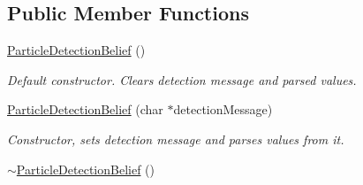 \subsection*{Public Member Functions}
\begin{DoxyCompactItemize}
\item 
\hypertarget{class_particle_detection_belief_a801d6337798aac5728eb16c76b06df9d}{
\hyperlink{class_particle_detection_belief_a801d6337798aac5728eb16c76b06df9d}{ParticleDetectionBelief} ()}
\label{class_particle_detection_belief_a801d6337798aac5728eb16c76b06df9d}

\begin{DoxyCompactList}\small\item\em Default constructor. Clears detection message and parsed values. \end{DoxyCompactList}\item 
\hypertarget{class_particle_detection_belief_a37a6e7bf59cf0476ea0e4b2d0f74425e}{
\hyperlink{class_particle_detection_belief_a37a6e7bf59cf0476ea0e4b2d0f74425e}{ParticleDetectionBelief} (char $\ast$detectionMessage)}
\label{class_particle_detection_belief_a37a6e7bf59cf0476ea0e4b2d0f74425e}

\begin{DoxyCompactList}\small\item\em Constructor, sets detection message and parses values from it. \end{DoxyCompactList}\item 
\hypertarget{class_particle_detection_belief_a4e08f4049e57297c6509ed65faec8c2e}{
\hyperlink{class_particle_detection_belief_a4e08f4049e57297c6509ed65faec8c2e}{$\sim$ParticleDetectionBelief} ()}
\label{class_particle_detection_belief_a4e08f4049e57297c6509ed65faec8c2e}


\end{DoxyCompactItemize}
